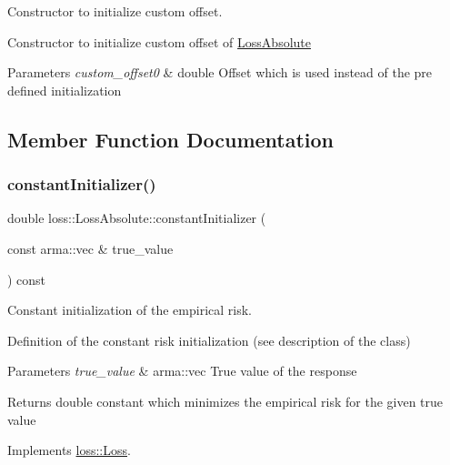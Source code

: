 Constructor to initialize custom offset. 

Constructor to initialize custom offset of {\ttfamily \mbox{\hyperlink{classloss_1_1_loss_absolute}{Loss\+Absolute}}}


\begin{DoxyParams}{Parameters}
{\em custom\+\_\+offset0} & {\ttfamily double} Offset which is used instead of the pre defined initialization \\
\hline
\end{DoxyParams}


\subsection{Member Function Documentation}
\mbox{\label{classloss_1_1_loss_absolute_a5272a952bf768a7bd790318b2f9cdcd6}} 
\subsubsection{\texorpdfstring{constant\+Initializer()}{constantInitializer()}}
{\footnotesize\ttfamily double loss\+::\+Loss\+Absolute\+::constant\+Initializer (\begin{DoxyParamCaption}\item[{const arma\+::vec \&}]{true\+\_\+value }\end{DoxyParamCaption}) const\hspace{0.3cm}{\ttfamily [virtual]}}



Constant initialization of the empirical risk. 

Definition of the constant risk initialization (see description of the class)


\begin{DoxyParams}{Parameters}
{\em true\+\_\+value} & {\ttfamily arma\+::vec} True value of the response\\
\hline
\end{DoxyParams}
\begin{DoxyReturn}{Returns}
{\ttfamily double} constant which minimizes the empirical risk for the given true value 
\end{DoxyReturn}


Implements \mbox{\hyperlink{classloss_1_1_loss_a65fe7dcd9370e6a549b8d1cc95fc8798}{loss\+::\+Loss}}.

